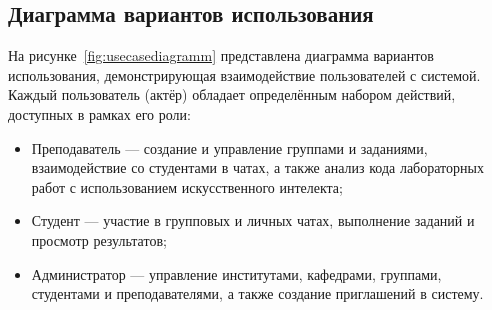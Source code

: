 \subsection{Диаграмма вариантов использования}

На рисунке~\ref{fig:usecasediagramm} представлена диаграмма вариантов использования, демонстрирующая взаимодействие пользователей с системой. Каждый пользователь (актёр) обладает определённым набором действий, доступных в рамках его роли:

\begin{itemize}
  \item Преподаватель — создание и управление группами и заданиями, взаимодействие со студентами в чатах, а также анализ кода лабораторных работ с использованием искусственного  интелекта;
  \item Студент — участие в групповых и личных чатах, выполнение заданий и просмотр результатов;
  \item Администратор — управление институтами, кафедрами, группами, студентами и преподавателями, а также создание приглашений в систему.
\end{itemize}
